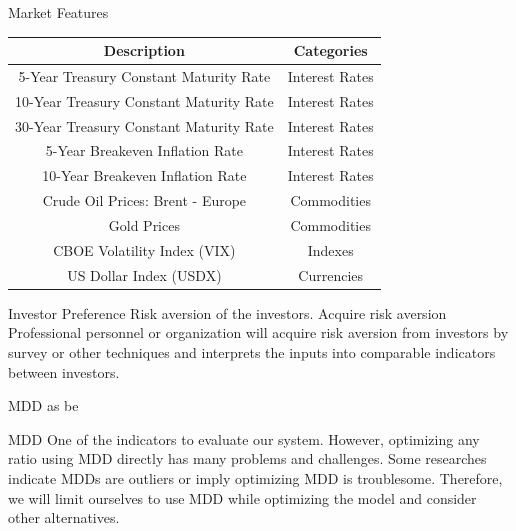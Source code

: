 \begin{frame}{Market Features}
\begin{tabular}{|| c| c||}
\hline
Description & Categories \\ \hline \hline
5-Year Treasury Constant Maturity Rate & Interest Rates\\ \hline
10-Year Treasury Constant Maturity Rate & Interest Rates\\ \hline
30-Year Treasury Constant Maturity Rate & Interest Rates\\ \hline
5-Year Breakeven Inflation Rate & Interest Rates\\ \hline
10-Year Breakeven Inflation Rate & Interest Rates\\ \hline
Crude Oil Prices: Brent - Europe &  Commodities\\ \hline
Gold Prices &  Commodities\\ \hline
CBOE Volatility Index (VIX) &  Indexes\\ \hline
US Dollar Index (USDX) &  Currencies\\ \hline
\end{tabular}
\end{frame}


\begin{frame}{Investor Preference}
Risk aversion of the investors. 
Acquire risk aversion
Professional personnel or organization will acquire risk aversion from investors by survey or other techniques and interprets the inputs into comparable indicators between investors.

MDD as be 

\begin{block}{MDD}
One of the indicators to evaluate our system. However, optimizing any ratio using MDD directly has many problems and challenges. Some researches indicate MDDs are outliers or imply optimizing MDD is troublesome. Therefore, we will limit ourselves to use MDD while optimizing the model and consider other alternatives. 
\end{block}
\end{frame}



